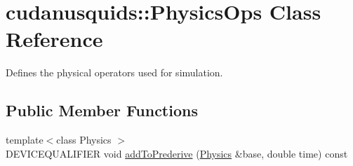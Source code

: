 \hypertarget{structcudanusquids_1_1PhysicsOps}{}\section{cudanusquids\+:\+:Physics\+Ops Class Reference}
\label{structcudanusquids_1_1PhysicsOps}


Defines the physical operators used for simulation.  


\subsection*{Public Member Functions}
\begin{DoxyCompactItemize}
\item 
{\footnotesize template$<$class Physics $>$ }\\D\+E\+V\+I\+C\+E\+Q\+U\+A\+L\+I\+F\+I\+ER void \hyperlink{structcudanusquids_1_1PhysicsOps_a4510392b0c1d86a3221289bf6da23958}{add\+To\+Prederive} (\hyperlink{structcudanusquids_1_1Physics}{Physics} \&base, double time) const \hypertarget{structcudanusquids_1_1PhysicsOps_a4510392b0c1d86a3221289bf6da23958}{}\label{structcudanusquids_1_1PhysicsOps_a4510392b0c1d86a3221289bf6da23958}


\end{DoxyCompactItemize}
